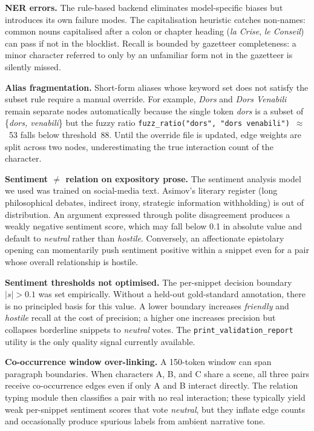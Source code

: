 \documentclass[a4paper]{article}
\begin{document}
\textbf{NER errors.} The rule-based backend eliminates model-specific
biases but introduces its own failure modes. The capitalisation heuristic
catches non-names: common nouns capitalised after a colon or chapter heading
(\textit{la Crise}, \textit{le Conseil}) can pass if not in the blocklist.
Recall is bounded by gazetteer completeness: a minor character referred to
only by an unfamiliar form not in the gazetteer is silently missed.

\textbf{Alias fragmentation.} Short-form aliases whose keyword set does not
satisfy the subset rule require a manual override. For example,
\textit{Dors} and \textit{Dors Venabili} remain separate nodes automatically
because the single token \textit{dors} is a subset of
\{\textit{dors, venabili}\} but the fuzzy ratio
\texttt{fuzz\_ratio("dors", "dors venabili")}~$\approx$~53 falls below
threshold~88. Until the override file is updated, edge weights are split
across two nodes, underestimating the true interaction count of the character.

\textbf{Sentiment $\neq$ relation on expository prose.}
The sentiment analysis model we used was trained on social-media text.
Asimov's literary register (long philosophical debates, indirect irony, strategic information withholding) is out of distribution.
An argument expressed through polite disagreement produces a weakly
negative sentiment score, which may fall below 0.1 in absolute value
and default to \textit{neutral} rather than \textit{hostile}.
Conversely, an affectionate epistolary opening can momentarily push
sentiment positive within a snippet even for a pair whose overall
relationship is hostile.

\textbf{Sentiment thresholds not optimised.}
The per-snippet decision boundary $|s|>0.1$ was set empirically.
Without a held-out gold-standard annotation, there is no principled
basis for this value. A lower boundary increases \textit{friendly}
and \textit{hostile} recall at the cost of precision; a higher one
increases precision but collapses borderline snippets to \textit{neutral}
votes. The \texttt{print\_validation\_report} utility is the only
quality signal currently available.

\textbf{Co-occurrence window over-linking.} A 150-token window can span paragraph boundaries. When characters A, B, and C share a scene, all three pairs receive co-occurrence edges even if only A and B interact directly. The relation typing module then classifies a pair with no real interaction; these typically yield weak per-snippet sentiment scores that vote \textit{neutral}, but they inflate edge counts and occasionally produce spurious labels from ambient narrative tone.
\end{document}
